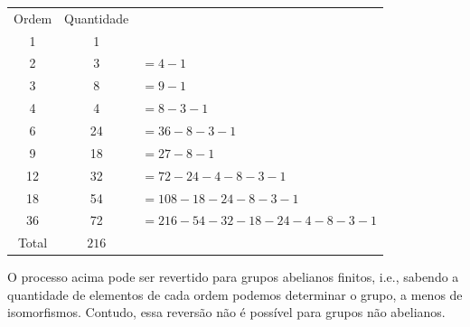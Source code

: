 \documentclass[a4paper,portuguese,11pt,twoside, leqno]{book}
\theoremstyle{definition}
\begin{document}
	\begin{center}
		\begin{tabular}{|c|c|l}
			\cline{1-2}
			Ordem & Quantidade & \\
			\cline{1-2}
			1 & 1 & \\
			\cline{1-2}
			2 & 3 & $= 4 - 1$\\
			\cline{1-2}
			3 & 8 & $= 9 - 1$\\
			\cline{1-2}
			4 & 4 & $= 8 - 3 - 1$\\
			\cline{1-2}
			6 & 24 & $= 36 - 8 - 3 - 1$\\
			\cline{1-2}
			9 & 18 & $= 27 - 8 - 1$\\
			\cline{1-2}
			12 & 32 & $= 72 - 24 - 4 - 8 - 3 - 1$\\
			\cline{1-2}
			18 & 54 & $= 108 - 18 - 24 - 8 - 3 - 1$\\
			\cline{1-2}
			36 & 72 & $= 216 - 54 - 32 - 18 - 24 - 4 - 8 - 3 - 1$ \\
			\cline{1-2}
			Total & $216$ &  \\
			\cline{1-2}
		\end{tabular}
	\end{center}
	\par\vspace{0.3cm} O processo acima pode ser revertido para grupos abelianos finitos, i.e., sabendo a quantidade de elementos de cada ordem podemos determinar o grupo, a menos de isomorfismos. Contudo, essa reversão não é possível para grupos não abelianos.
\end{document}
